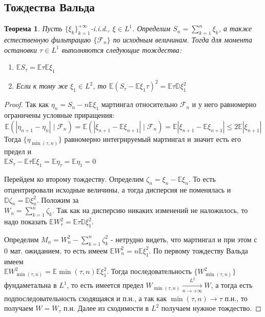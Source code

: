 \documentclass[12pt,a4paper]{article} %
\newtheorem{theorem}{Теорема}
\newcommand{\E}{\mathbb{E}}
\newcommand{\D}{\mathbb{D}}
\newcommand{\F}{\mathcal{F}}
\begin{document}
	\subsection{Тождества Вальда}
	\begin{theorem}
		Пусть $\{\xi_k\}_{k=1}^{+\infty}$-i.i.d., $\xi\in L^1$. Определим $S_n=\displaystyle\sum_{k=1}^n\xi_k$, а также естественную фильтрацию $\{\F_n\}$ по исходным величинам. Тогда для момента остановки $\tau\in L^1$ выполняются следующие тождества:
		\begin{enumerate}
			\item $\E S_{\tau}=\E\tau\E\xi_1$
			\item Если к тому же $\xi_1\in L^2$, то $\E(S_{\tau}-\E\xi_1\tau)^2=\E\tau\D\xi_1^2$
		\end{enumerate}
	\end{theorem}
	\begin{proof}
		Так как $\eta_n=S_n-n\E\xi_1$ мартингал относительно $\F_n$ и у него равномерно ограничены условные приращения:
		$$\E(|\eta_{n+1}-\eta_n|\mid\F_n)=\E(|\xi_{n+1}-\E\xi_{n+1}|\mid\F_n)=\E|\xi_{n+1}-\E\xi_{n+1}|\leq2\E|\xi_{n+1}|$$
		Тогда $\{\eta_{\min(\tau,n)}\}$ равномерно интегрируемый мартингал и значит есть его предел и\\ $\E S_{\tau}-\E\tau\E\xi_1=\E\eta_{\tau}=\E\eta_1=0$
		
		Перейдем ко второму тождеству. Определим $\zeta_n=\xi_n-\E\xi_n$. То есть отцентрировали исходные величины, а тогда дисперсия не поменялась и $\D\zeta_n=\D\xi_n^2$. Положим за \\$W_n=\displaystyle\sum_{k=1}^n\zeta_k$. Так как на дисперсию никаких изменений не наложилось, то надо показать $\E W_{\tau}^2=\E\tau\D\xi_1^2$.
		
		Определим $M_n=W_n^2-\displaystyle\sum_{k=1}^n\zeta_k^2$ - нетрудно видеть, что мартингал и при этом с 0 мат. ожиданием, то есть имеем $\E W_n^2=n\E\xi_1^2$. По первому тождеству Вальда имеем \\$\E W_{\min(\tau,n)}^2=\E\min(\tau,n)\E\xi_1^2$. Тогда последовательность $\{W_{\min(\tau,n)}^2\}$ фундаметальна в $L^1$, то есть имеется предел $W_{\min(\tau,n)}\xrightarrow[n\rightarrow+\infty]{L^2}W$, а тогда есть подпоследовательность сходящаяся и п.н., а так как $\min(\tau,n)\rightarrow\tau$ п.н., то получаем $W=W_{\tau}$ п.н. Далее из сходимости в $L^2$ получаем нужное тождество.
	\end{proof}
\end{document}
